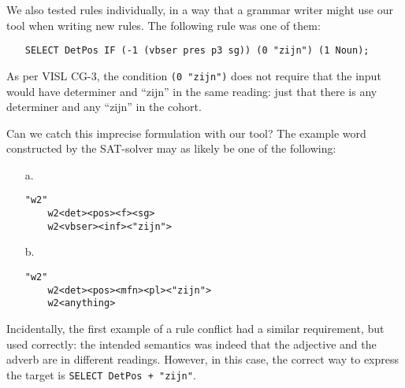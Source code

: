 

We also tested rules individually, in a way that a grammar writer might use our tool when writing new rules.
The following rule was one of them:

\begin{itemize}
\item[] 
\texttt{SELECT DetPos IF (-1 (vbser pres p3 sg)) (0 "zijn") (1 Noun);}
\end{itemize} 

As per VISL CG-3, the condition \texttt{(0 "zijn")} does not require that the input would have determiner and ``zijn'' in the same reading: just that there is any determiner and any ``zijn'' in the cohort. 


Can we catch this imprecise formulation with our tool? The example word constructed by the SAT-solver may as likely be one of the following:

\begin{itemize}
\item[a.] \begin{verbatim}
"w2"
    w2<det><pos><f><sg>
    w2<vbser><inf><"zijn">
\end{verbatim}

\item[b.] \begin{verbatim}
"w2"
    w2<det><pos><mfn><pl><"zijn">
    w2<anything>
\end{verbatim}
\end{itemize}

Incidentally, the first example of a rule conflict had a similar requirement, but used correctly: the intended semantics was indeed that the adjective and the adverb are in different readings. However, in this case, the correct way to express the target is \texttt{SELECT DetPos + "zijn"}.

